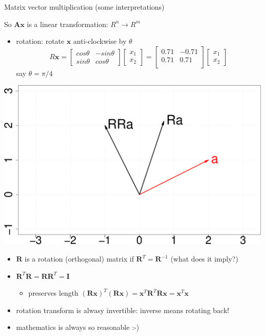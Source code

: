 \documentclass{scrartcl}
\def\tightlist{}
\newcommand{\vv}[1]{\boldsymbol{#1}}
\begin{document}
\begin{frame}{Matrix vector multiplication (some interpretations)}
\protect\hypertarget{matrix-vector-multiplication-some-interpretations}{}

So \(\vv{A}\vv{x}\) is a linear transformation: \(R^n\rightarrow R^m\)

\begin{itemize}
\tightlist
\item
  rotation: rotate \(\vv{x}\) anti-clockwise by \(\theta\)
  \[R\vv{x} = \begin{bmatrix} cos\theta & -sin\theta \\
  sin\theta & cos\theta\end{bmatrix} \begin{bmatrix} x_1\\ x_2\end{bmatrix} = \begin{bmatrix}0.71&-0.71 \\0.71&0.71 \\\end{bmatrix} \begin{bmatrix} x_1\\ x_2\end{bmatrix}\]
  say \(\theta = \pi/4\)
\end{itemize}

\begin{center}\includegraphics[width=0.5\linewidth]{math4ml_files/figure-beamer/unnamed-chunk-10-1} \end{center}

\end{frame}

\begin{frame}{}
\protect\hypertarget{section-4}{}

\begin{itemize}
\tightlist
\item
  \(\vv{R}\) is a rotation (orthogonal) matrix if
  \(\vv{R}^T = \vv{R}^{-1}\) (what does it imply?)
\item
  \(\vv{R}^T\vv{R} = \vv{R}\vv{R}^T =\vv{I}\) \pause 

  \begin{itemize}
  \tightlist
  \item
    preserves length
    \((\vv{R}\vv{x})^T(\vv{R}\vv{x}) = \vv{x}^T\vv{R}^T\vv{R}\vv{x} = \vv{x}^T\vv{x}\)
  \end{itemize}
\item
  rotation transform is alwasy invertible: inverse means rotating back!
\item
  mathematics is always so reasonable :-)
\end{itemize}

\end{frame}
\end{document}
